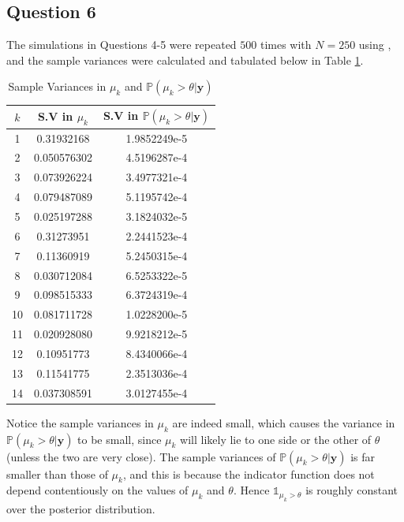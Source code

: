 \documentclass[10pt,a4paper,notitlepage]{article}
\newcommand{\p}{\mathbb{P}}
\newcommand{\y}{\mathbf{y}}
\begin{document}
\subsection*{\centering Question 6}
The simulations in Questions 4-5 were repeated $500$ times with $N=250$ using , and the sample variances were calculated and tabulated below in Table \ref{tb:3}. 
\begin{table}[H]
\centering
\begin{tabular}{c|c|c}
$k$&S.V in $\mu_{k}$ & S.V in $\p(\mu_{k}>\theta|\y)$\\
\hline
1 & 0.31932168 & 1.9852249e-5\\
2 & 0.050576302 & 4.5196287e-4\\
3 & 0.073926224 & 3.4977321e-4\\
4 & 0.079487089 & 5.1195742e-4\\
5 & 0.025197288 & 3.1824032e-5\\
6 & 0.31273951 & 2.2441523e-4\\
7 & 0.11360919 & 5.2450315e-4\\
8 & 0.030712084 & 6.5253322e-5\\
9 & 0.098515333 & 6.3724319e-4\\
10 & 0.081711728 & 1.0228200e-5\\
11 & 0.020928080 & 9.9218212e-5\\
12 & 0.10951773 & 8.4340066e-4\\
13 & 0.11541775 & 2.3513036e-4\\
14 & 0.037308591 & 3.0127455e-4\\
\end{tabular}
\caption{Sample Variances in $\mu_{k}$ and $\p(\mu_{k}>\theta|\y)$}\label{tb:3}
\end{table}
Notice the sample variances in $\mu_{k}$ are indeed small, which causes the variance in $\p(\mu_{k}>\theta|\y)$ to be small, since $\mu_{k}$ will likely lie to one side or the other of $\theta$ (unless the two are very close). The sample variances of $\p(\mu_{k}>\theta|\y)$ is far smaller than those of $\mu_{k}$, and this is because the indicator function does not depend contentiously on the values of $\mu_{k}$ and $\theta$. Hence $\mathds{1}_{\mu_{k}>\theta}$ is roughly constant over the posterior distribution.
\end{document}
